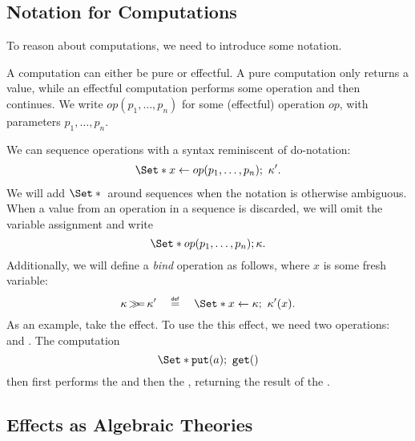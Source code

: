 \subsection{Notation for Computations}

To reason about computations, we need to introduce some notation.

A computation can either be pure or effectful. A pure computation only returns a value, while an effectful computation performs some operation and then continues. We write $op(p_1, \dots, p_n)$ for some (effectful) operation $op$, with parameters $p_1,\dots,p_n$.

We can sequence operations with a syntax reminiscent of do-notation:
\begin{align*}
    \S{x \gets op(p_1,\dots,p_n)\seq \kappa'}.
\end{align*}
We will add $\S{}$ around sequences when the notation is otherwise ambiguous. When a value from an operation in a sequence is discarded, we will omit the variable assignment and write 
\[ \S{op(p_1,\dots,p_n); \kappa}. \]
Additionally, we will define a \emph{bind} operation \bind as follows, where $x$ is some fresh variable:
\[ 
    \kappa \bind \kappa' \quad\defeq\quad \S{x \gets \kappa\seq \kappa'(x)}.
\]
As an example, take the  effect. To use the this effect, we need two operations:  and . The computation
\[ \S{\oput(a)\seq \oget()} \]
then first performs the \oput and then the \oget, returning the result of the \oget.

\subsection{Effects as Algebraic Theories}

